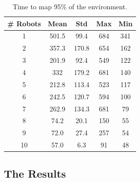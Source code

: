 \begin{table}
\centering
\caption{Time to map 95\% of the environment.}
\label{table:timing}
\begin{tabular}{c|c|c|c|c}
\hline
\hline
\# Robots & Mean & Std  & Max & Min \\
\hline
1 &  501.5  &  99.4  & 684  & 341\\
\hline
2 &  357.3  & 170.8  & 654  & 162\\
\hline
3 & 201.9   & 92.4  & 549  & 122\\
\hline
4 &  332  & 179.2 & 681  & 140\\
\hline
5 &  212.8  & 113.4  & 523  & 117\\
\hline
6  & 242.5  & 120.7  & 594  & 100\\
\hline
7  & 262.9  & 134.3  & 681  &  79\\
\hline
8  &  74.2  &  20.1 &  150  & 55\\
\hline
9  &  72.0  &  27.4  & 257   & 54\\
\hline
10  &  57.0 &   6.3  &  91  &  48\\
\hline
\hline
\end{tabular}
\end{table}



\subsection{The Results}
\label{S:Exp:Results}


